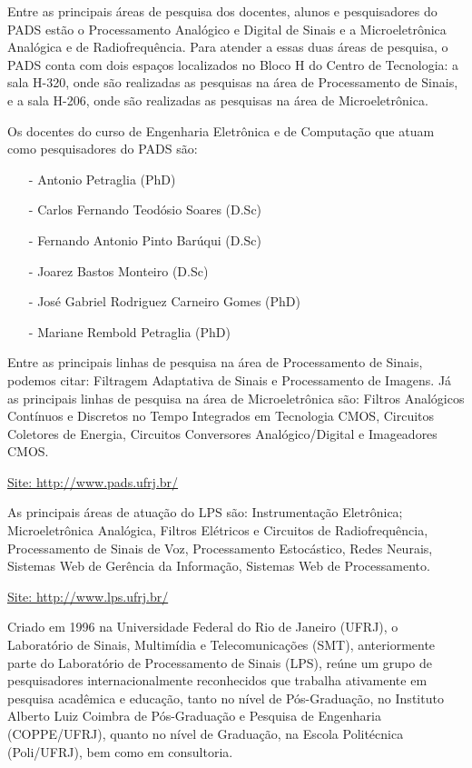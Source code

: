        	Entre as principais áreas de pesquisa dos docentes, alunos e pesquisadores do PADS estão o Processamento Analógico e Digital de Sinais e a Microeletrônica Analógica e de Radiofrequência. Para atender a essas duas áreas de pesquisa, o PADS conta com dois espaços localizados no Bloco H do Centro de Tecnologia: a sala H-320, onde são realizadas as pesquisas na área de Processamento de Sinais, e a sala H-206, onde são realizadas as pesquisas na área de Microeletrônica.

        	Os docentes do curso de Engenharia Eletrônica e de Computação que atuam como pesquisadores do PADS são:   
             \begin{itemize}
              \item[-] Antonio Petraglia (PhD)
              \item[-] Carlos Fernando Teodósio Soares (D.Sc) 
              \item[-] Fernando Antonio Pinto Barúqui (D.Sc)
              \item[-] Joarez Bastos Monteiro (D.Sc)
              \item[-] José Gabriel Rodriguez Carneiro Gomes (PhD)
              \item[-] Mariane Rembold Petraglia (PhD)
             \end{itemize}     
        	Entre as principais linhas de pesquisa na área de Processamento de Sinais, podemos citar: Filtragem Adaptativa de Sinais e Processamento de Imagens. Já as principais linhas de pesquisa na área de Microeletrônica são: Filtros Analógicos Contínuos e Discretos no Tempo Integrados em Tecnologia CMOS, Circuitos Coletores de Energia, Circuitos Conversores Analógico/Digital e Imageadores CMOS.

        \href{http://www.pads.ufrj.br/}{Site: http://www.pads.ufrj.br/}

        	As principais áreas de atuação do LPS são: Instrumentação Eletrônica; Microeletrônica Analógica, Filtros Elétricos e Circuitos de Radiofrequência, Processamento de Sinais de Voz, Processamento Estocástico, Redes Neurais, Sistemas Web de Gerência da Informação, Sistemas Web de Processamento.

        \href{http://www.lps.ufrj.br/}{Site: http://www.lps.ufrj.br/}

        	Criado em 1996 na Universidade Federal do Rio de Janeiro (UFRJ), o Laboratório de Sinais, Multimídia e Telecomunicações (SMT), anteriormente parte do Laboratório de Processamento de Sinais (LPS), reúne um grupo de pesquisadores internacionalmente reconhecidos que trabalha ativamente em pesquisa acadêmica e educação, tanto no nível de Pós-Graduação, no Instituto Alberto Luiz Coimbra de Pós-Graduação e Pesquisa de Engenharia (COPPE/UFRJ), quanto no nível de Graduação, na Escola Politécnica (Poli/UFRJ), bem como em consultoria.

